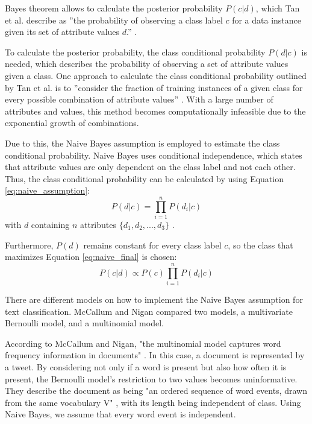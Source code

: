 
        Bayes theorem allows to calculate the posterior probability $P(c|d)$, which Tan et al. describe as ''the probability of observing a class label $c$ for a data instance given its set of attribute values $d$.'' \cite[p.~418]{DBLP:books/aw/TanSKK2019}. 

        To calculate the posterior probability, the class conditional probability $P(d|c)$ is needed, which describes the probability of observing a set of attribute values given a class. One approach to calculate the class conditional probability outlined by Tan et al. is to ''consider the fraction of training instances of a given class for every possible combination of attribute values'' \cite[p.~419]{DBLP:books/aw/TanSKK2019}. With a large number of attributes and values, this method becomes computationally infeasible due to the exponential growth of combinations. \cite{DBLP:books/aw/TanSKK2019}

        Due to this, the Naive Bayes assumption is employed to estimate the class conditional probability. Naive Bayes uses conditional independence, which states that attribute values are only dependent on the class label and not each other. Thus, the class conditional probability can be calculated by using Equation \eqref{eq:naive_assumption}:
        \begin{equation}
            \label{eq:naive_assumption}
            P(d|c) = \prod_{i=1}^{n}P(d_{i}|c)
        \end{equation}
        with $d$ containing $n$ attributes $\{d_1,d_2,...,d_3\}$ \cite{DBLP:books/aw/TanSKK2019}.

        Furthermore, $P(d)$ remains constant for every class label $c$, so the class that maximizes Equation \eqref{eq:naive_final} is chosen: 
        \begin{equation}
            \label{eq:naive_final}
            P(c|d)\propto P(c)\prod_{i=1}^{n}P(d_{i}|c) 
        \end{equation}   
        
        
        There are different models on how to implement the Naive Bayes assumption for text classification. McCallum and Nigan compared two models, a multivariate Bernoulli model, and a multinomial model. 
        
        According to McCallum and Nigan, "the multinomial model captures word frequency information in documents" \cite[p.~3]{Mccallum1998}. In this case, a document is represented by a tweet. By considering not only if a word is present but also how often it is present, the Bernoulli model's restriction to two values becomes uninformative. They describe the document as being "an ordered sequence of word events, drawn from the same vocabulary V" \cite[p.~3]{Mccallum1998}, with its length being independent of class. Using Naive Bayes, we assume that every word event is independent.
        
